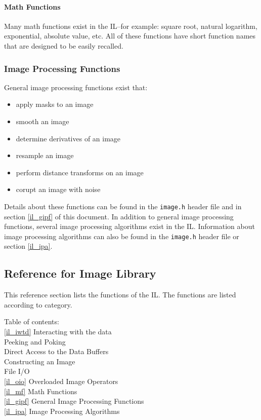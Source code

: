 \paragraph{Math Functions}
Many math functions exist in the IL--for example: square root, natural logarithm,
exponential, absolute value, etc.  All of these functions have short function
names that are designed to be easily recalled.

\subsubsection{Image Processing Functions}
General image processing functions exist that:
\begin{itemize}
\item{apply masks to an image}
\item{smooth an image}
\item{determine derivatives of an image}
\item{resample an image}
\item{perform distance transforms on an image}
\item{corupt an image with noise}
\end{itemize}
Details about these functions can be found in the {\tt image.h} header file
and in section \ref{il_gipf} of this document.
In addition to general image processing functions,
several image processing algorithms exist in the IL.
Information about image processing algorithms can also be found in
the {\tt image.h} header file or section \ref{il_ipa}.

\subsection{Reference for Image Library}
\label{iref}
This reference section lists the functions of the IL.
The functions are listed according to category.

Table of contents:\\
\hspace*{0.25in}\ref{il_iwtd} Interacting with the data\\
\hspace*{0.5in}Peeking and Poking\\
\hspace*{0.5in}Direct Access to the Data Buffers\\
\hspace*{0.5in}Constructing an Image\\
\hspace*{0.5in}File I/O\\
\hspace*{0.25in}\ref{il_oio} Overloaded Image Operators\\
\hspace*{0.25in}\ref{il_mf} Math Functions\\
\hspace*{0.25in}\ref{il_gipf} General Image Processing Functions\\
\hspace*{0.25in}\ref{il_ipa} Image Processing Algorithms\\

